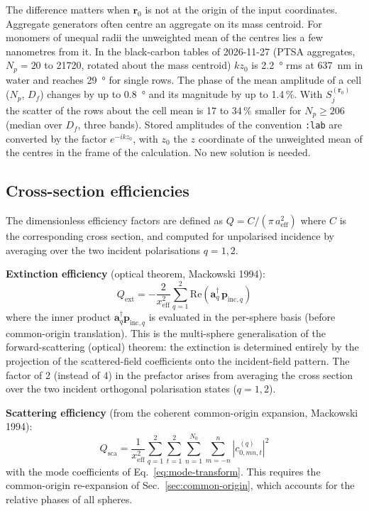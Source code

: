 \documentclass[11pt,a4paper]{article}
\begin{document}
The difference matters when $\bm{r}_0$ is not at the origin of the input coordinates.
Aggregate generators often centre an aggregate on its mass centroid.
For monomers of unequal radii the unweighted mean of the centres lies a few nanometres from it.
In the black-carbon tables of 2026-11-27 (PTSA aggregates, $N_p = 20$ to \num{21720}, rotated about the mass centroid) $k z_0$ is \SI{2.2}{\degree} rms at \SI{637}{\nano\meter} in water and reaches \SI{29}{\degree} for single rows.
The phase of the mean amplitude of a cell ($N_p$, $D_f$) changes by up to \SI{0.8}{\degree} and its magnitude by up to 1.4\,\%.
With $S_j^{(\bm{r}_0)}$ the scatter of the rows about the cell mean is 17 to 34\,\% smaller for $N_p \ge 206$ (median over $D_f$, three bands).
Stored amplitudes of the convention \texttt{:lab} are converted by the factor $e^{-ikz_0}$, with $z_0$ the $z$ coordinate of the unweighted mean of the centres in the frame of the calculation.
No new solution is needed.

\subsection{Cross-section efficiencies}

The dimensionless efficiency factors are defined as $Q = C / (\pi\,a_\mathrm{eff}^2)$ where $C$ is the corresponding cross section, and computed for unpolarised incidence by averaging over the two incident polarisations $q = 1, 2$.

\textbf{Extinction efficiency} (optical theorem, Mackowski 1994):
\begin{equation}
  Q_\mathrm{ext} = -\frac{2}{x_\mathrm{eff}^2}
  \sum_{q=1}^{2} \mathrm{Re}\!\left(\bm{a}_q^\dagger \,\bm{p}_{\mathrm{inc},q}\right)
  \label{eq:qext}
\end{equation}
where the inner product $\bm{a}_q^\dagger \bm{p}_{\mathrm{inc},q}$ is evaluated in the per-sphere basis (before common-origin translation).
This is the multi-sphere generalisation of the forward-scattering (optical) theorem: the extinction is determined entirely by the projection of the scattered-field coefficients onto the incident-field pattern.
The factor of 2 (instead of 4) in the prefactor arises from averaging the cross section over the two incident orthogonal polarisation states ($q=1, 2$).

\textbf{Scattering efficiency} (from the coherent common-origin expansion, Mackowski 1994):
\begin{equation}
  Q_\mathrm{sca} = \frac{1}{x_\mathrm{eff}^2}
  \sum_{q=1}^{2} \sum_{t=1}^{2} \sum_{n=1}^{N_0} \sum_{m=-n}^{n} \left| c_{0,mn,t}^{(q)} \right|^2
  \label{eq:qsca}
\end{equation}
with the mode coefficients of Eq.~\eqref{eq:mode-transform}.
This requires the common-origin re-expansion of Sec.~\ref{sec:common-origin}, which accounts for the relative phases of all spheres.
\end{document}
